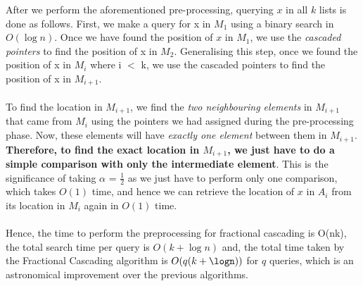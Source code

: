 \documentclass[11pt]{article}
\begin{document}
After we perform the aforementioned pre-processing, querying $x$ in all $k$ lists is done as follows.
First, we make a query for x in $M_1$ using a binary search in $O(\log n)$. Once we have found the position of $x$ in $M_1$, we use the \textit{cascaded pointers} to find the position of x in $M_2$. Generalising this step, once we found the position of x in $M_i$ where i $<$ k, we use the cascaded pointers to find the position of x in $M_{i+1}$. \\ \\
To find the location in $M_{i+1}$, we find the \textit{two neighbouring elements} in $M_{i+1}$ that came from $M_i$ using the pointers we had assigned during the pre-processing phase. Now, these elements will have \textit{exactly one element} between them in $M_{i+1}$. \textbf{Therefore, to find the exact location in $M_{i+1}$, we just have to do a simple comparison with only the intermediate element}. This is the significance of taking $\alpha$ = $\frac{1}{2}$ as we just have to perform only one comparison, which takes $O(1)$ time, and hence we can retrieve the location of $x$ in $A_i$ from its location in $M_i$ again in $O(1)$ time. \\ \\

Hence, the time to perform the preprocessing for fractional cascading is O(nk), the total search time per query is $O(k+\log n)$ and, the total time taken by the Fractional Cascading algorithm is $O(q(k+\logn))$ for $q$ queries, which is an astronomical improvement over the previous algorithms.



\end{document}
